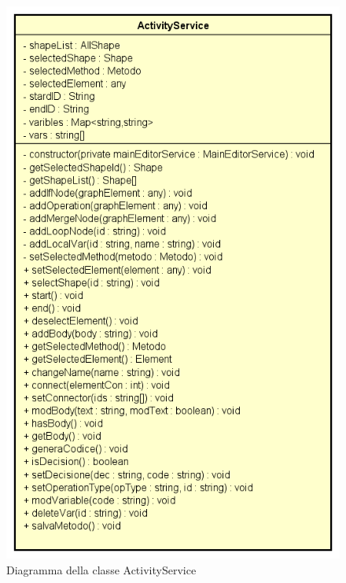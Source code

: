 \begin{figure}[h!]
	\centering
	\includegraphics[scale=0.8]{res/sections/SpecificaFrontEnd/Services/Disegnetti/activity.png}
	\caption{Diagramma della classe ActivityService}
\end{figure}

